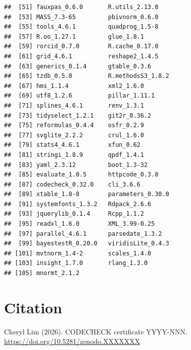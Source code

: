 \documentclass[
]{article}
\begin{document}
\begin{verbatim}
##  [51] fauxpas_0.6.0       R.utils_2.13.0     
##  [53] MASS_7.3-65         pbivnorm_0.6.0     
##  [55] tools_4.6.1         quadprog_1.5-8     
##  [57] R.oo_1.27.1         glue_1.8.1         
##  [59] rorcid_0.7.0        R.cache_0.17.0     
##  [61] grid_4.6.1          reshape2_1.4.5     
##  [63] generics_0.1.4      gtable_0.3.6       
##  [65] tzdb_0.5.0          R.methodsS3_1.8.2  
##  [67] hms_1.1.4           xml2_1.6.0         
##  [69] utf8_1.2.6          pillar_1.11.1      
##  [71] splines_4.6.1       renv_1.3.1         
##  [73] tidyselect_1.2.1    git2r_0.36.2       
##  [75] reformulas_0.4.4    osfr_0.2.9         
##  [77] svglite_2.2.2       crul_1.6.0         
##  [79] stats4_4.6.1        xfun_0.62          
##  [81] stringi_1.8.9       qpdf_1.4.1         
##  [83] yaml_2.3.12         boot_1.3-32        
##  [85] evaluate_1.0.5      httpcode_0.3.0     
##  [87] codecheck_0.32.0    cli_3.6.6          
##  [89] xtable_1.8-8        parameters_0.30.0  
##  [91] systemfonts_1.3.2   Rdpack_2.6.6       
##  [93] jquerylib_0.1.4     Rcpp_1.1.2         
##  [95] readxl_1.6.0        XML_3.99-0.25      
##  [97] parallel_4.6.1      parsedate_1.3.2    
##  [99] bayestestR_0.20.0   viridisLite_0.4.3  
## [101] mvtnorm_1.4-2       scales_1.4.0       
## [103] insight_1.7.0       rlang_1.3.0        
## [105] mnormt_2.1.2
\end{verbatim}

\section{Citation}\label{citation}

Cheryl Lim (2026). CODECHECK certificate YYYY-NNN.
\url{https://doi.org/10.5281/zenodo.XXXXXXX}
\end{document}

